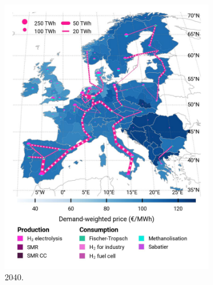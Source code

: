 \documentclass[preprint,12pt,sort&compress]{elsarticle}
\begin{document}
\begin{figure}[htbp]
\begin{subfigure}[t]{0.33\textwidth}
      \includegraphics[width=1\textwidth]{maps/pcipmi/base_s_adm___2040-balance_map_H2}
      \caption{ 2040.}
      \label{fig:PCI_lt_2040_h2}
  \end{subfigure}
  \begin{subfigure}[t]{0.33\textwidth}
    \vspace{0pt}

\end{subfigure}
\end{figure}
\end{document}

